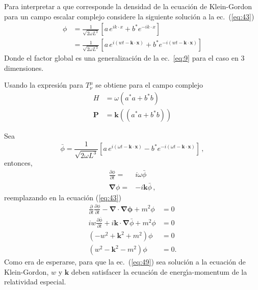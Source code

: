 Para interpretar a que corresponde la densidad de la ecuaci\'on de
Klein-Gordon para un campo escalar complejo considere la siguiente
soluci\'on a la ec.~(\ref{eq:43})
\begin{align}
  \phi&=\frac{1}{\sqrt{2\omega L^3}}
  \left[
    a\, e^{ik\cdot x}+b^*e^{-ik\cdot x}
  \right]\nonumber\\
  \label{eq:49}
   &=\frac{1}{\sqrt{2\omega L^3}}
   \left[
     a\, e^{i(wt-\mathbf{k}\cdot\mathbf{x})}+b^*e^{-i(wt-\mathbf{k}\cdot\mathbf{x})}
   \right]
\end{align}
Donde el factor global es una generalizaci\'on de la ec.~\eqref{eq:9} para el caso en 3 dimensiones. 

Usando la expresi\'on para $T^\mu_\nu$ se obtiene para el campo complejo
\begin{align}
  H&=\omega(a^*a+b^*b)\nonumber\\
  \mathbf{P}&=\mathbf{k}((a^*a+b^*b))
\end{align}

Sea
\begin{equation}
  \label{eq:50}
  \bar{\phi}=\frac{1}{\sqrt{2\omega L^3}}
  \left[
    a\, e^{i(\omega t-\mathbf{k}\cdot\mathbf{x})}-b^*e^{-i(\omega t-\mathbf{k}\cdot\mathbf{x})}
  \right]\,,
\end{equation}
entonces, 
\begin{align*}
 \frac{\partial \phi}{\partial t}=&i \omega \bar{\phi}\\
 \boldsymbol{\nabla}\phi=&-i \mathbf{k} \bar{\phi}\,,
\end{align*}
reemplazando en la ecuaci\'on (\ref{eq:43})
\begin{align}
\frac{\partial}{\partial t}\frac{\partial\phi}{\partial t}-\boldsymbol{\nabla}\cdot\boldsymbol{\nabla\phi}+m^2\phi&=0\nonumber\\
  iw\frac{\partial\bar{\phi}}{\partial t}+i\mathbf{k}\cdot\boldsymbol{\nabla}\bar{\phi}+m^2\phi&=0\nonumber\\
  (-w^2+\mathbf{k}^2+m^2)\phi&=0\nonumber\\
  (w^2-\mathbf{k}^2-m^2)\phi&=0.
\end{align}
Como era de esperarse, para que la ec.~(\ref{eq:49}) sea soluci\'on a la
ecuaci\'on de Klein-Gordon, $w$ y $\mathbf{k}$ deben satisfacer la
ecuaci\'on de energ\'\i a-momentum de la relatividad especial. 

